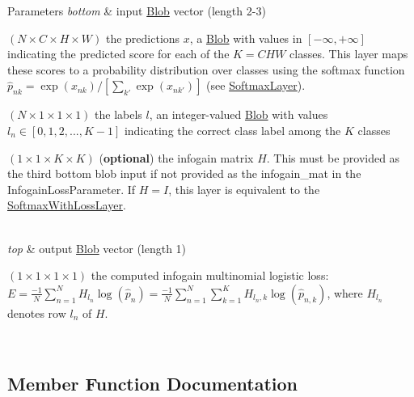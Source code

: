 \begin{DoxyParams}{Parameters}
{\em bottom} & input \hyperlink{classcaffe_1_1Blob}{Blob} vector (length 2-\/3)
\begin{DoxyEnumerate}
\item $ (N \times C \times H \times W) $ the predictions $ x $, a \hyperlink{classcaffe_1_1Blob}{Blob} with values in $ [-\infty, +\infty] $ indicating the predicted score for each of the $ K = CHW $ classes. This layer maps these scores to a probability distribution over classes using the softmax function $ \hat{p}_{nk} = \exp(x_{nk}) / \left[\sum_{k'} \exp(x_{nk'})\right] $ (see \hyperlink{classcaffe_1_1SoftmaxLayer}{Softmax\+Layer}).
\item $ (N \times 1 \times 1 \times 1) $ the labels $ l $, an integer-\/valued \hyperlink{classcaffe_1_1Blob}{Blob} with values $ l_n \in [0, 1, 2, ..., K - 1] $ indicating the correct class label among the $ K $ classes
\item $ (1 \times 1 \times K \times K) $ ({\bfseries optional}) the infogain matrix $ H $. This must be provided as the third bottom blob input if not provided as the infogain\+\_\+mat in the Infogain\+Loss\+Parameter. If $ H = I $, this layer is equivalent to the \hyperlink{classcaffe_1_1SoftmaxWithLossLayer}{Softmax\+With\+Loss\+Layer}. 
\end{DoxyEnumerate}\\
\hline
{\em top} & output \hyperlink{classcaffe_1_1Blob}{Blob} vector (length 1)
\begin{DoxyEnumerate}
\item $ (1 \times 1 \times 1 \times 1) $ the computed infogain multinomial logistic loss\+: $ E = \frac{-1}{N} \sum\limits_{n=1}^N H_{l_n} \log(\hat{p}_n) = \frac{-1}{N} \sum\limits_{n=1}^N \sum\limits_{k=1}^{K} H_{l_n,k} \log(\hat{p}_{n,k}) $, where $ H_{l_n} $ denotes row $l_n$ of $H$. 
\end{DoxyEnumerate}\\
\hline
\end{DoxyParams}


\subsection{Member Function Documentation}
